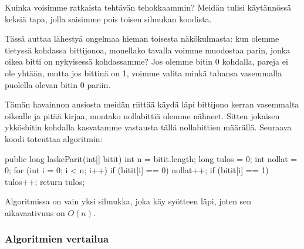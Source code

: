 Kuinka voisimme ratkaista tehtävän tehokkaammin?
Meidän tulisi käytän\-nössä keksiä tapa, jolla saisimme
pois toisen silmukan koodista.

Tässä auttaa lähestyä ongelmaa hieman toisesta
näkökulmasta: kun olemme tietyssä kohdassa bittijonoa,
monellako tavalla voimme muodostaa parin,
jonka oikea bitti on nykyisessä kohdassamme?
Jos olemme bitin 0 kohdalla, pareja ei ole yhtään,
mutta jos bittinä on 1, voimme valita minkä tahansa
vasemmalla puolella olevan bitin 0 pariin.

Tämän havainnon ansiosta meidän riittää käydä läpi
bittijono kerran vasemmalta oikealle ja pitää kirjaa,
montako nollabittiä olemme nähneet.
Sitten jokaisen ykkösbitin kohdalla kasvatamme
vastausta tällä nollabittien määrällä.
Seuraava koodi toteuttaa algoritmin:

\begin{code}
public long laskeParit(int[] bitit) {
    int n = bitit.length;
    long tulos = 0;
    int nollat = 0;
    for (int i = 0; i < n; i++) {
        if (bitit[i] == 0) nollat++;
        if (bitit[i] == 1) tulos++;
    }
    return tulos;
}
\end{code}

Algoritmissa on vain yksi silmukka, joka käy syötteen läpi,
joten sen aikavaativuus on $O(n)$.

\subsubsection{Algoritmien vertailua}


